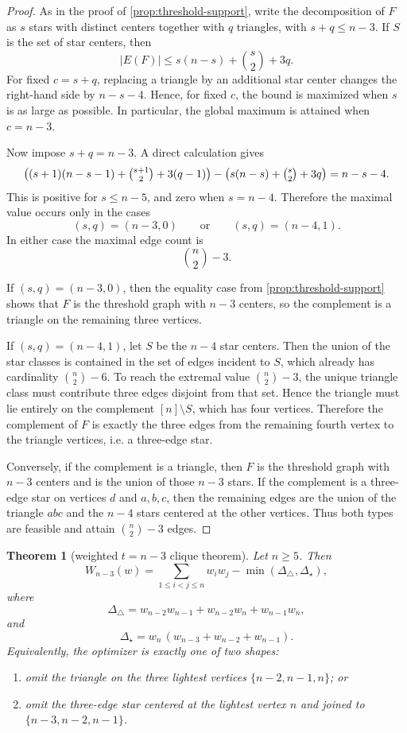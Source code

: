 \documentclass[11pt]{article}
\newtheorem{theorem}{Theorem}[section]
\theoremstyle{definition}
\begin{document}
\begin{proof}
As in the proof of \cref{prop:threshold-support}, write the decomposition of \(F\) as \(s\) stars with distinct centers together with \(q\) triangles, with \(s+q\le n-3\). If \(S\) is the set of star centers, then
\[
|E(F)|\le s(n-s)+\binom{s}{2}+3q.
\]
For fixed \(c=s+q\), replacing a triangle by an additional star center changes the right-hand side by \(n-s-4\). Hence, for fixed \(c\), the bound is maximized when \(s\) is as large as possible. In particular, the global maximum is attained when \(c=n-3\).

Now impose \(s+q=n-3\). A direct calculation gives
\[
\bigl((s+1)(n-s-1)+\tbinom{s+1}{2}+3(q-1)\bigr)-\bigl(s(n-s)+\tbinom{s}{2}+3q\bigr)=n-s-4.
\]
This is positive for \(s\le n-5\), and zero when \(s=n-4\). Therefore the maximal value occurs only in the cases
\[
(s,q)=(n-3,0)\qquad\text{or}\qquad (s,q)=(n-4,1).
\]
In either case the maximal edge count is
\[
\binom n2-3.
\]

If \((s,q)=(n-3,0)\), then the equality case from \cref{prop:threshold-support} shows that \(F\) is the threshold graph with \(n-3\) centers, so the complement is a triangle on the remaining three vertices.

If \((s,q)=(n-4,1)\), let \(S\) be the \(n-4\) star centers. Then the union of the star classes is contained in the set of edges incident to \(S\), which already has cardinality \(\binom n2-6\). To reach the extremal value \(\binom n2-3\), the unique triangle class must contribute three edges disjoint from that set. Hence the triangle must lie entirely on the complement \([n]\setminus S\), which has four vertices. Therefore the complement of \(F\) is exactly the three edges from the remaining fourth vertex to the triangle vertices, i.e. a three-edge star.

Conversely, if the complement is a triangle, then \(F\) is the threshold graph with \(n-3\) centers and is the union of those \(n-3\) stars. If the complement is a three-edge star on vertices \(d\) and \(a,b,c\), then the remaining edges are the union of the triangle \(abc\) and the \(n-4\) stars centered at the other vertices. Thus both types are feasible and attain \(\binom n2-3\) edges.
\end{proof}

\begin{theorem}[weighted \(t=n-3\) clique theorem]\label{thm:weighted-nm3}
Let \(n\ge 5\). Then
\[
W_{n-3}(w)=
\sum_{1\le i<j\le n} w_iw_j
-
\min(\Delta_\triangle,\Delta_\star),
\]
where
\[
\Delta_\triangle
=
w_{n-2}w_{n-1}+w_{n-2}w_n+w_{n-1}w_n,
\]
and
\[
\Delta_\star
=
w_n\,(w_{n-3}+w_{n-2}+w_{n-1}).
\]
Equivalently, the optimizer is exactly one of two shapes:
\begin{enumerate}[label=(\roman*)]
    \item omit the triangle on the three lightest vertices \(\{n-2,n-1,n\}\); or
    \item omit the three-edge star centered at the lightest vertex \(n\) and joined to \(\{n-3,n-2,n-1\}\).
\end{enumerate}
\end{theorem}
\end{document}
